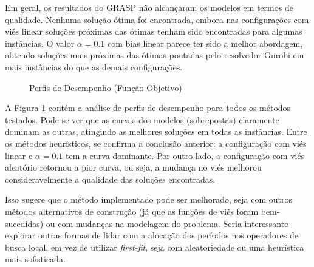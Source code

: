 \documentclass{MO824}
\begin{document}
Em geral, os resultados do GRASP não alcançaram os modelos em termos de qualidade. Nenhuma solução ótima foi encontrada, embora nas configurações com viés linear soluções próximas das ótimas tenham sido encontradas para algumas instâncias. O valor $\alpha = 0.1$ com bias linear parece ter sido a melhor abordagem, obtendo soluções mais próximas das ótimas pontadas pelo resolvedor Gurobi em mais instâncias do que as demais configurações.

\begin{figure}[ht]
    \centering
    \caption{Perfis de Desempenho (Função Objetivo)}
    \label{fig:pp_obj}
\end{figure}

A Figura \ref{fig:pp_obj} contém a análise de perfis de desempenho para todos os métodos testados. Pode-se ver que as curvas dos modelos (sobrepostas) claramente dominam as outras, atingindo as melhores soluções em todas as instâncias. Entre os métodos heurísticos, se confirma a conclusão anterior: a configuração com viés linear e $\alpha=0.1$ tem a curva dominante. Por outro lado, a configuração com viés aleatório retornou a pior curva, ou seja, a mudança no viés melhorou consideravelmente a qualidade das soluções encontradas.

Isso sugere que o método implementado pode ser melhorado, seja com outros métodos alternativos de construção (já que as funções de viés foram bem-sucedidas) ou com mudanças na modelagem do problema. Seria interessante explorar outras formas de lidar com a alocação dos períodos nos operadores de busca local, em vez de utilizar \emph{first-fit}, seja com aleatoriedade ou uma heurística mais sofisticada.
\end{document}

